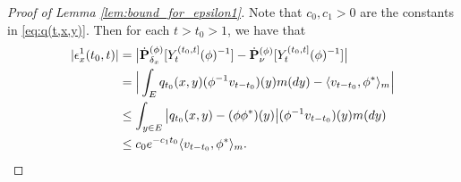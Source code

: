 \documentclass[12pt,a4paper]{amsart}
\theoremstyle{definition}
\numberwithin{equation}{section}
\begin{document}
\begin{proof}
  [Proof of Lemma \ref{lem:bound_for_epsilon1}]
  Note that $c_0, c_1>0$ are the constants in \eqref{eq:q(t,x,y)}.
  Then for each $t > t_0 > 1$, we have that
  \begin{align}
    |\epsilon_x^1(t_0,t)|
    & = \big| \dot {\mathbf P}_{\delta_x}^{(\phi)} [Y^{(t_0,t]}_t(\phi)^{-1}] - \dot {\mathbf P}_\nu^{(\phi)} [Y^{(t_0,t]}_t(\phi)^{-1}] \big| \\
    & = \Big|  \int_E  q_{t_0}(x,y)(\phi^{-1}v_{t-t_0})(y) m(dy) - \langle v_{t-t_0},\phi^* \rangle_m \Big|\\
    & \leq \int_{y\in E} \big| q_{t_0}(x,y) - (\phi\phi^*)(y) \big| (\phi^{-1}v_{t-t_0})(y) m(dy)\\
    & \leq c_0 e^{-c_1 t_0}\langle v_{t-t_0},\phi^* \rangle_m.
      \qedhere
  \end{align}
\end{proof}
\end{document}
